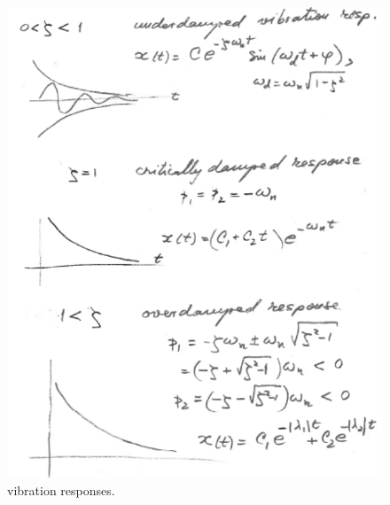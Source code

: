 \documentclass[12pt,letter]{article}
\begin{document}
\begin{figure}[H]
	\centering
	\includegraphics[width=6.5in]{../figures/vibration_responses.png}
	\caption{vibration responses.}
\end{figure}
\end{document}
